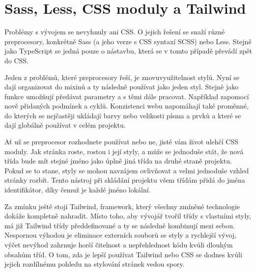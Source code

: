 \section{Sass, Less, CSS moduly a Tailwind}

Problémy s vývojem se nevyhnuly ani CSS. O jejich řešení se snaží různé preprocesory, konkrétně Sass\cite{Sass} (a jeho verze s CSS syntaxí SCSS) nebo Less\cite{Less}. Stejně jako TypeScript se jedná pouze o nástavbu, která se v tomto případě převádí zpět do CSS.

Jeden z problémů, které preprocesory řeší, je znovuvyužitelnost stylů. Nyní se dají organizovat do mixinů a ty následně používat jako jeden styl. Stejně jako funkce umožňují předávat parametry a s těmi dále pracovat. Například zapomocí nově přidaných podmínek a cyklů. Konzistenci webu napomáhají také proměnné, do kterých se nejčastěji ukládají barvy nebo velikosti písma a prvků a které se dají globálně používat v celém projektu. 

Ať už se preprocesor rozhodnete používat nebo ne, jistě vám život ulehčí CSS moduly.\cite{CssModules} Jak stránka roste, rostou i její styly, a může se jednoduše stát, že nová třída bude mít stejné jméno jako úplně jiná třída na druhé straně projektu. Pokud se to stane, styly se mohou navzájem ovlivňovat a velmi jednoduše vzhled stránky rozbít. Tento nástroj při skládání projektu všem třídám přidá do jména identifikátor, díky čemuž je každé jméno lokální.

Za zmínku ještě stojí Tailwind, framework, který všechny zmíněné technologie dokáže kompletně nahradit. Místo toho, aby vývojář tvořil třídy s vlastními styly, má již Tailwind třídy předdefinované a ty se následně kombinují mezi sebou. Nespornou výhodou je eliminace externích souborů se styly a rychlejší vývoj, výčet nevýhod zahrnuje horší čitelnost a nepřehlednost kódu kvůli dlouhým obsahům tříd. O tom, zda je lepší používat Tailwind nebo CSS se dodnes kvůli jejich rozdílnému pohledu na stylování stránek vedou spory. \cite{Tailwind}